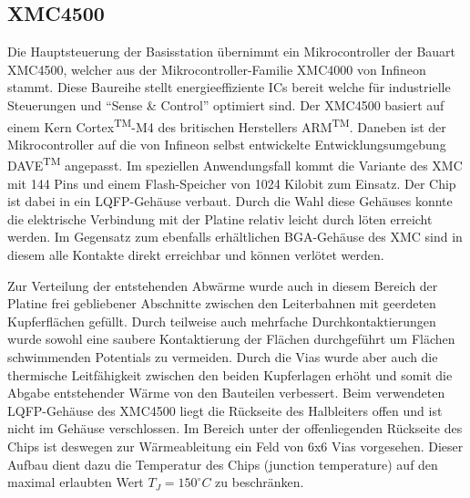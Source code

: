 \subsection{XMC4500}
Die Hauptsteuerung der Basisstation übernimmt ein Mikrocontroller der Bauart XMC4500, welcher aus der Mikrocontroller-Familie XMC4000 von Infineon stammt. Diese Baureihe stellt energieeffiziente \acp{IC} bereit welche für industrielle Steuerungen und \enquote{Sense \& Control} optimiert sind. 
Der XMC4500 basiert auf einem Kern Cortex\textsuperscript{TM}-M4 des britischen Herstellers ARM\textsuperscript{TM}. Daneben ist der Mikrocontroller auf die von Infineon selbst entwickelte Entwicklungsumgebung DAVE\textsuperscript{TM} angepasst.
Im speziellen Anwendungsfall kommt die Variante des XMC mit 144 Pins und einem Flash-Speicher von 1024 Kilobit zum Einsatz. Der Chip ist dabei in ein  \ac{LQFP}-Gehäuse verbaut. Durch die Wahl diese Gehäuses konnte die elektrische Verbindung mit der Platine relativ leicht durch löten erreicht werden. Im Gegensatz zum ebenfalls erhältlichen \ac{BGA}-Gehäuse des XMC sind in diesem alle Kontakte direkt erreichbar und können verlötet werden.


Zur Verteilung der entstehenden Abwärme wurde auch in diesem Bereich der Platine  frei gebliebener Abschnitte zwischen den Leiterbahnen mit geerdeten Kupferflächen gefüllt. Durch teilweise auch mehrfache Durchkontaktierungen wurde sowohl eine saubere Kontaktierung der Flächen durchgeführt um Flächen schwimmenden Potentials zu vermeiden. Durch die Vias wurde aber auch die thermische Leitfähigkeit zwischen den beiden Kupferlagen erhöht und somit die Abgabe entstehender Wärme von den Bauteilen verbessert. Beim verwendeten \ac{LQFP}-Gehäuse des XMC4500 liegt die Rückseite des Halbleiters offen und ist nicht im Gehäuse verschlossen. Im Bereich unter der offenliegenden Rückseite des Chips ist deswegen zur Wärmeableitung ein Feld von 6x6 Vias vorgesehen. Dieser Aufbau dient dazu die Temperatur des Chips (junction temperature) auf den maximal erlaubten Wert $T_J = 150^\circ C$ zu beschränken.%


